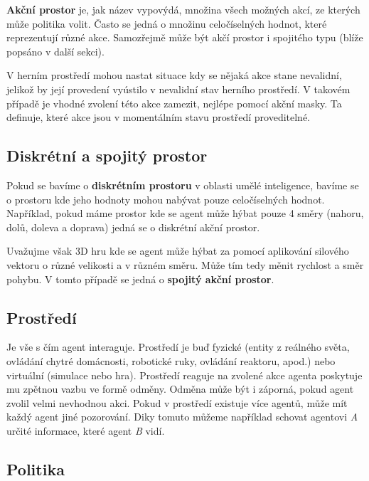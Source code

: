 \textbf{Akční prostor} je, jak název vypovýdá, množina všech možných akcí, ze kterých může politika volit.
Často se jedná o množinu celočíselných hodnot, které reprezentují různé akce.
Samozřejmě může být akčí prostor i spojitého typu (blíže popsáno v další sekci).

V herním prostředí mohou nastat situace kdy se nějaká akce stane nevalidní, jelikož by její provedení vyústilo v nevalidní stav herního prostředí.
V takovém případě je vhodné zvolení této akce zamezit, nejlépe pomocí akční masky.
Ta definuje, které akce jsou v momentálním stavu prostředí proveditelné.

\subsection{Diskrétní a spojitý prostor}\label{subsec:diskretni-a-spojity-prostor}

Pokud se bavíme o \textbf{diskrétním prostoru} v oblasti umělé inteligence, bavíme se o prostoru kde jeho hodnoty mohou nabývat pouze celočíselných hodnot.
Například, pokud máme prostor kde se agent může hýbat pouze 4 směry (nahoru, dolů, doleva a doprava) jedná se o diskrétní akční prostor.

\bigskip

Uvažujme však 3D hru kde se agent může hýbat za pomocí aplikování silového vektoru o různé velikosti a v různém směru.
Může tím tedy měnit rychlost a směr pohybu.
V tomto případě se jedná o \textbf{spojitý akční prostor}.

\subsection{Prostředí}\label{subsec:prostredi2}

Je vše s čím agent interaguje.
Prostředí je buď fyzické (entity z reálného světa, ovládání chytré domácnosti, robotické ruky, ovládání reaktoru, apod.) nebo virtuální (simulace nebo hra).
Prostředí reaguje na zvolené akce agenta poskytuje mu zpětnou vazbu ve formě odměny.
Odměna může být i záporná, pokud agent zvolil velmi nevhodnou akci.
Pokud v prostředí existuje více agentů, může mít každý agent jiné pozorování.
Diky tomuto můžeme například schovat agentovi \textit{A} určité informace, které agent \textit{B} vidí.

\subsection{Politika}\label{subsec:politika}

